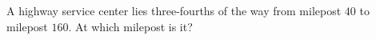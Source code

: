 A highway service center lies three-fourths of the way from milepost $40$ to milepost $160$. At which milepost is it?
